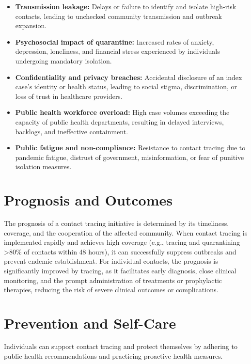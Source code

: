 \begin{itemize}
    \item \textbf{Transmission leakage:} Delays or failure to identify and isolate high-risk contacts, leading to unchecked community transmission and outbreak expansion.
    \item \textbf{Psychosocial impact of quarantine:} Increased rates of anxiety, depression, loneliness, and financial stress experienced by individuals undergoing mandatory isolation.
    \item \textbf{Confidentiality and privacy breaches:} Accidental disclosure of an index case's identity or health status, leading to social stigma, discrimination, or loss of trust in healthcare providers.
    \item \textbf{Public health workforce overload:} High case volumes exceeding the capacity of public health departments, resulting in delayed interviews, backlogs, and ineffective containment.
    \item \textbf{Public fatigue and non-compliance:} Resistance to contact tracing due to pandemic fatigue, distrust of government, misinformation, or fear of punitive isolation measures.
\end{itemize}

\section*{Prognosis and Outcomes}
The prognosis of a contact tracing initiative is determined by its timeliness, coverage, and the cooperation of the affected community. When contact tracing is implemented rapidly and achieves high coverage (e.g., tracing and quarantining >80\% of contacts within 48 hours), it can successfully suppress outbreaks and prevent endemic establishment. For individual contacts, the prognosis is significantly improved by tracing, as it facilitates early diagnosis, close clinical monitoring, and the prompt administration of treatments or prophylactic therapies, reducing the risk of severe clinical outcomes or complications.

\section*{Prevention and Self-Care}
Individuals can support contact tracing and protect themselves by adhering to public health recommendations and practicing proactive health measures.

